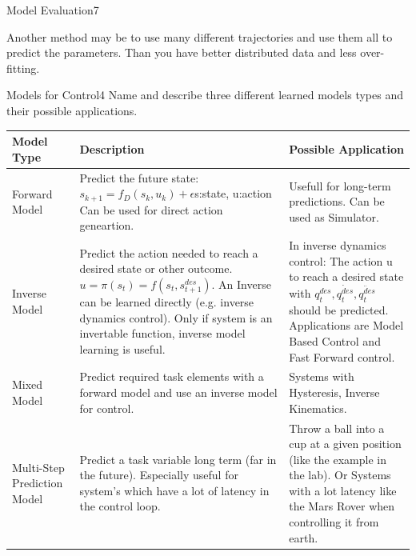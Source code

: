 \begin{questions}
\begin{question}{Model Evaluation}{7}
\begin{answer}
	Another method may be to use many different trajectories and use them all to predict the parameters. Than you have better distributed data and less over-fitting.
	
\end{answer}

\end{question}



\begin{question}[bonus]{Models for Control}{4}
Name and describe three different learned models types and their possible applications.
\end{question}
\begin{answer}

\begin{tabular}{|p{4cm}|p{7cm}|p{5cm}|}
		\hline
		Model Type&Description  &Possible Application \\
		\hline
				Forward Model &Predict the future state: $s_{k+1}=f_D(s_k,u_k)+\epsilon$s:state, u:action Can be used for direct action geneartion.  &Usefull for long-term predictions. Can be used as Simulator.
			\\	\hline
			Inverse Model &Predict the action needed to reach a desired state or other outcome. $u=\pi(s_t)=f(s_t,s_{t+1}^{des})$. An Inverse can be learned directly (e.g. inverse dynamics control). Only if system is an invertable function, inverse model learning is useful.&In inverse dynamics control: The action u to reach a desired state with $q_t^{des}, \dot{q_t^{des}},\ddot{q_t^{des}}$ should be predicted. Applications are Model Based Control and Fast Forward control. 	 \\	 \hline 

		Mixed Model&Predict required task elements with a forward model and use an inverse model for control.&Systems with Hysteresis, Inverse Kinematics. \\  \hline
		
		Multi-Step Prediction Model&Predict a task variable long term (far in the future). Especially useful for system's which have a lot of latency in the control loop.                                      &Throw a ball into a cup at a given position (like the example in the lab). Or Systems with a lot latency like the Mars Rover when controlling it from earth.  \\ \hline
\end{tabular}
	
	\end{answer}




\end{questions}
